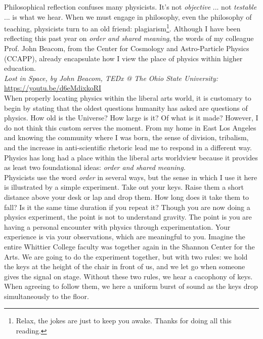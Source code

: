 \documentclass[../../../main.tex]{subfiles}
\begin{document}
Philosophical reflection confuses many physicists.  It's not \textit{objective} ... not \textit{testable} ... is what we hear.  When we must engage in philosophy, even the philosophy of teaching, physicists turn to an old friend: plagiarism\footnote{Relax, the jokes are just to keep you awake.  Thanks for doing all this reading.}.  Although I have been reflecting this past year on \textit{order and shared meaning}, the words of my colleague Prof. John Beacom, from the Center for Cosmology and Astro-Particle Physics (CCAPP), already encapsulate how I view the place of physics within higher education.
\\
\vspace{0.25cm}
\textit{Lost in Space, by John Beacom, TEDx @ The Ohio State University:} \url{https://youtu.be/d6eMdixkoRI}
\\
\vspace{0.25cm}
When properly locating physics within the liberal arts world, it is customary to begin by stating that the oldest questions humanity has asked are questions of physics.  How old is the Universe?  How large is it?  Of what is it made?  However, I do not think this custom serves the moment.  From my home in East Los Angeles and knowing the community where I was born, the sense of division, tribalism, and the increase in anti-scientific rhetoric lead me to respond in a different way.  Physics has long had a place within the liberal arts worldview because it provides as least two foundational ideas: \textit{order and shared meaning.}
\\
\vspace{0.25cm}
Physicists use the word \textit{order} in several ways, but the sense in which I use it here is illustrated by a simple experiment.  Take out your keys.  Raise them a short distance above your desk or lap and drop them.  How long does it take them to fall?  Is it the same time duration if you repeat it?  Though you are now doing a physics experiment, the point is not to understand gravity.  The point is you are having a personal encounter with physics through experimentation.  Your experience is via your observations, which are meaningful to you.  Imagine the entire Whittier College faculty was together again in the Shannon Center for the Arts.  We are going to do the experiment together, but with two rules: we hold the keys at the height of the chair in front of us, and we let go when someone gives the signal on stage.  Without these two rules, we hear a cacophony of keys.  When agreeing to follow them, we here a uniform burst of sound as the keys drop simultaneously to the floor.
\end{document}
